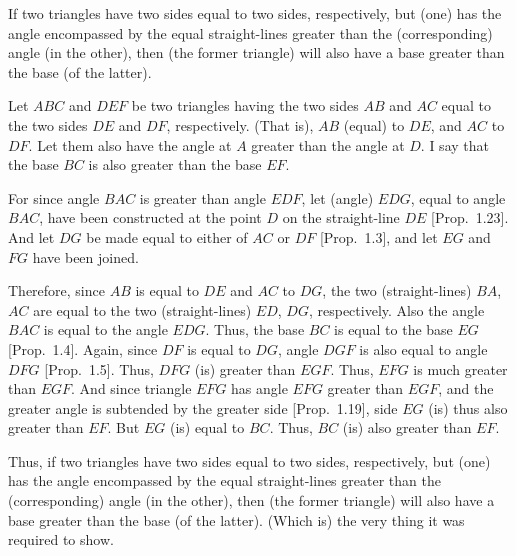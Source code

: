 \begin{Parallel}{}{}
{If two triangles have two sides equal to two sides, respectively,
but (one) has the angle encompassed by the equal straight-lines greater than the (corresponding)
angle (in the other), then (the former triangle) will also have a base greater than the base (of the latter).

\epsfysize=2in
\centerline{}

Let  $ABC$ and $DEF$ be two triangles having the two sides $AB$ and $AC$
equal to the two sides $DE$ and $DF$, respectively. (That is), $AB$ (equal) to $DE$, and
$AC$ to $DF$.  Let them also have the angle at $A$ greater than the angle at $D$.
I say that the base $BC$ is also greater than the base $EF$.

For since angle $BAC$ is greater than angle $EDF$, let (angle) $EDG$, equal to
angle $BAC$,  have been constructed at  the point $D$ on the straight-line $DE$ [Prop.~1.23]. And let $DG$ be made equal to either of $AC$ or $DF$ [Prop.~1.3], and let $EG$ and $FG$ have been joined.

Therefore, since $AB$ is equal to $DE$ and $AC$ to $DG$, the two (straight-lines)
$BA$, $AC$ are equal to the two (straight-lines) $ED$, $DG$, respectively.
Also the angle $BAC$ is equal to the angle $EDG$. Thus, the base $BC$ is equal
to the base $EG$ [Prop.~1.4]. Again, since $DF$ is equal to $DG$, angle $DGF$
is also equal to angle $DFG$ [Prop.~1.5]. Thus, $DFG$ (is) greater than $EGF$.
Thus, $EFG$ is much greater than $EGF$. And since triangle $EFG$ has angle $EFG$
greater than $EGF$, and the greater angle is subtended by the greater side [Prop.~1.19], side $EG$ (is) thus also greater than $EF$. But $EG$ (is) equal to
$BC$. Thus, $BC$ (is) also greater than $EF$.

Thus, if two triangles have two sides equal to two sides, respectively,
but (one) has the angle encompassed by the equal straight-lines greater than the 
(corresponding) angle (in the other), then (the former triangle) will also have a base greater than the base (of the latter).
(Which is) the very thing it was required to show.}
\end{Parallel}

